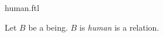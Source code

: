 \documentclass{stex}
\begin{document}
\begin{smodule}{human.ftl}



\begin{signature*}[forthel,for=human]
  Let $B$ be a being.
  $B$ is \emph{human} is a relation.
\end{signature*}

\end{smodule}
\end{document}
